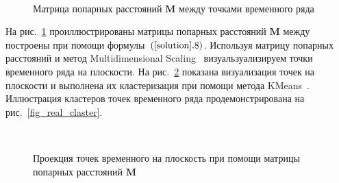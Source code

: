 \documentclass[12pt, twoside]{article}
\begin{document}
\begin{figure}[h!t]\center
{}
\\
\caption{Матрица попарных расстояний $\textbf{M}$ между точками временного ряда}
\label{fig_real_distance}
\end{figure}

На рис.~\ref{fig_real_distance} проиллюстрированы матрицы попарных расстояний $\textbf{M}$ между построены при помощи формулы~$(\ref{solution}.8)$. Используя матрицу попарных расстояний и метод Multidimensional Scaling~\cite{Borg2005} визуальзуализируем точки временного ряда на плоскости. На рис.~\ref{fig_real_2D} показана визуализация точек на плоскости и выполнена их кластеризация при помощи метода KMeans~\cite{Kanungo2000}. Иллюстрация кластеров точек временного ряда продемонстрирована на рис.~\ref{fig_real_claster}.


\begin{figure}[h!t]\center
{}
\\
\caption{Проекция точек временного на плоскость при помощи матрицы попарных расстояний $\textbf{M}$}
\label{fig_real_2D}
\end{figure}
\end{document}
